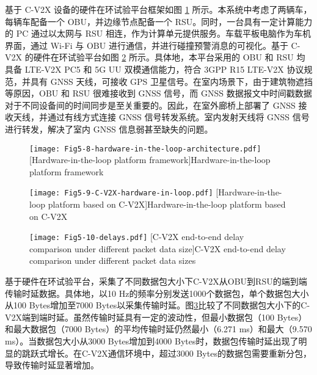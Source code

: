 基于 C-V2X 设备的硬件在环试验平台框架如图 \ref{fig 5-7} 所示。本系统中考虑了两辆车，每辆车配备一个 OBU，并边缘节点配备一个 RSU。同时，一台具有一定计算能力的 PC 通过以太网与 RSU 相连，作为计算单元提供服务。车载平板电脑作为车机界面，通过 Wi-Fi 与 OBU 进行通信，并进行碰撞预警消息的可视化。基于 C-V2X 的硬件在环试验平台如图 \ref{fig 5-8} 所示。具体地，本平台采用的 OBU 和 RSU 均具备 LTE-V2X PC5 和 5G UU 双模通信能力，符合 3GPP R15 LTE-V2X 协议规范，并具有 GNSS 天线，可接收 GPS 卫星信号。在室内场景下，由于建筑物遮挡等原因，OBU 和 RSU 很难接收到 GNSS 信号，而 GNSS 数据报文中时间戳数据对于不同设备间的时间同步是至关重要的。因此，在室外廊桥上部署了 GNSS 接收天线，并通过有线方式连接 GNSS 信号转发系统。室内发射天线将 GNSS 信号进行转发，解决了室内 GNSS 信息弱甚至缺失的问题。

\begin{figure}[h]
\centering
  \texttt{[image: Fig5-8-hardware-in-the-loop-architecture.pdf]}
  [Hardware-in-the-loop platform framework]{Hardware-in-the-loop platform framework}
  \label{fig 5-7}
\end{figure}

\begin{figure}[h]
\centering
  \texttt{[image: Fig5-9-C-V2X-hardware-in-loop.pdf]}
  [Hardware-in-the-loop platform based on C-V2X]{Hardware-in-the-loop platform based on C-V2X}
  \label{fig 5-8}
\end{figure}

\begin{figure}[h]
\centering
  \texttt{[image: Fig5-10-delays.pdf]}
  [C-V2X end-to-end delay comparison under different packet data size]{C-V2X end-to-end delay comparison under different packet data sizes}
  \label{fig 5-9}
\end{figure}

基于硬件在环试验平台，采集了不同数据包大小下C-V2X从OBU到RSU的端到端传输时延数据。具体地，以10 Hz的频率分别发送1000个数据包，单个数据包大小从100 Bytes增加至7000 Bytes以采集传输时延。图\ref{fig 5-9}比较了不同数据包大小下的C-V2X端到端时延。虽然传输时延具有一定的波动性，但最小数据包（100 Bytes）和最大数据包（7000 Bytes）的平均传输时延仍然最小（6.271 ms）和最大（9.570 ms）。当数据包大小从3000 Bytes增加到4000 Bytes时，数据包传输时延出现了明显的跳跃式增长。在C-V2X通信环境中，超过3000 Bytes的数据包需要重新分包，导致传输时延显著增加。

